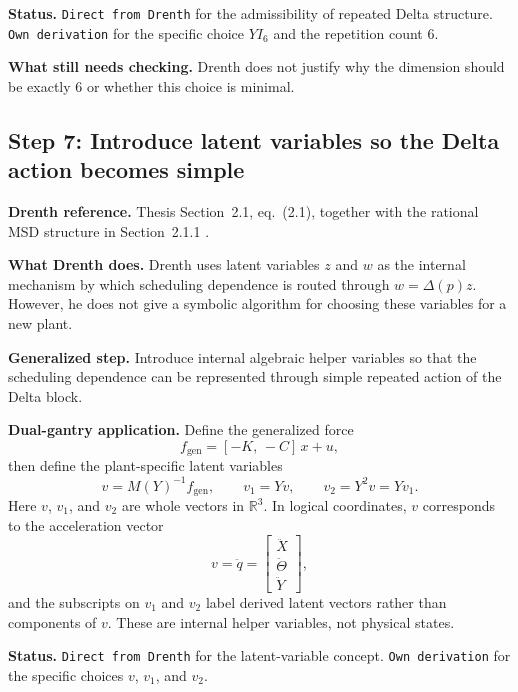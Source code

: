 \documentclass[11pt]{article}
\newcommand{\R}{\mathbb{R}}
\newcommand{\audititem}[2]{\par\smallskip\noindent\textbf{#1.} #2\par}
\newcommand{\statusline}[1]{\texttt{#1}}
\begin{document}
\audititem{Status}{\statusline{Direct from Drenth} for the admissibility of
repeated Delta structure. \statusline{Own derivation} for the specific choice
$YI_6$ and the repetition count $6$.}

\audititem{What still needs checking}{Drenth does not justify why the dimension
should be exactly $6$ or whether this choice is minimal.}

\subsection{Step 7: Introduce latent variables so the Delta action becomes simple}

\audititem{Drenth reference}{Thesis Section~2.1, eq.~(2.1), together with the
rational MSD structure in Section~2.1.1 \cite{drenth2025thesis}.}

\audititem{What Drenth does}{Drenth uses latent variables $z$ and $w$ as the
internal mechanism by which scheduling dependence is routed through
$w = \Delta(p)z$. However, he does not give a symbolic algorithm for choosing
these variables for a new plant.}

\audititem{Generalized step}{Introduce internal algebraic helper variables so
that the scheduling dependence can be represented through simple repeated action
of the Delta block.}

\audititem{Dual-gantry application}{Define the generalized force
\begin{equation}
    f_{\mathrm{gen}} = [-K,\,-C]\,x + u,
    \label{eqv:fgen}
\end{equation}
then define the plant-specific latent variables
\begin{equation}
    v = M(Y)^{-1} f_{\mathrm{gen}}, \qquad
    v_1 = Yv, \qquad
    v_2 = Y^2 v = Y v_1.
    \label{eqv:latent}
\end{equation}
Here $v$, $v_1$, and $v_2$ are whole vectors in $\R^3$. In logical coordinates,
$v$ corresponds to the acceleration vector
\[
v = \ddot q = \begin{bmatrix} \ddot X \\ \ddot \Theta \\ \ddot Y \end{bmatrix},
\]
and the subscripts on $v_1$ and $v_2$ label derived latent vectors rather than
components of $v$. These are internal helper variables, not physical states.}

\audititem{Status}{\statusline{Direct from Drenth} for the latent-variable
concept. \statusline{Own derivation} for the specific choices
$v$, $v_1$, and $v_2$.}
\end{document}

